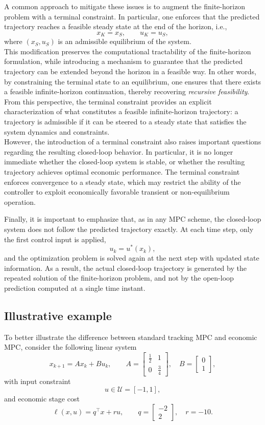 A common approach to mitigate these issues is to augment the finite-horizon problem with a terminal constraint. In particular, one enforces that the predicted trajectory reaches a feasible steady state at the end of the horizon, i.e.,
\[
x_K = x_S, \qquad u_K = u_S,
\]
where $(x_S,u_S)$ is an admissible equilibrium of the system.\\
This modification preserves the computational tractability of the finite-horizon formulation, while introducing a mechanism to guarantee that the predicted trajectory can be extended beyond the horizon in a feasible way. In other words, by constraining the terminal state to an equilibrium, one ensures that there exists a feasible infinite-horizon continuation, thereby recovering \emph{recursive feasibility}.\\

From this perspective, the terminal constraint provides an explicit characterization of what constitutes a feasible infinite-horizon trajectory: a trajectory is admissible if it can be steered to a steady state that satisfies the system dynamics and constraints.\\
However, the introduction of a terminal constraint also raises important questions regarding the resulting closed-loop behavior. In particular, it is no longer immediate whether the closed-loop system is stable, or whether the resulting trajectory achieves optimal economic performance. The terminal constraint enforces convergence to a steady state, which may restrict the ability of the controller to exploit economically favorable transient or non-equilibrium operation.

Finally, it is important to emphasize that, as in any MPC scheme, the closed-loop system does not follow the predicted trajectory exactly. At each time step, only the first control input is applied,
\[
u_k = u^*(x_k),
\]
and the optimization problem is solved again at the next step with updated state information. As a result, the actual closed-loop trajectory is generated by the repeated solution of the finite-horizon problem, and not by the open-loop prediction computed at a single time instant.

\subsection{Illustrative example}
To better illustrate the difference between standard tracking MPC and economic MPC, consider the following linear system
\[
x_{k+1} = A x_k + B u_k, \qquad 
A = \begin{bmatrix} \tfrac{1}{2} & 1 \\ 0 & \tfrac{3}{4} \end{bmatrix}, \quad 
B = \begin{bmatrix} 0 \\ 1 \end{bmatrix},
\]
with input constraint
\[
u \in \mathcal{U} = [-1,1],
\]
and economic stage cost
\[
\ell(x,u) = q^\top x + r u, \qquad 
q = \begin{bmatrix} -2 \\ 2 \end{bmatrix}, \quad r = -10.
\]
